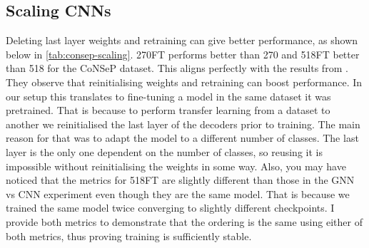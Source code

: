 \begin{table}[ht]
\vspace{0.2cm}

\caption{MoNuSAC dataset.}
    \label{tab:void-gnn}
\end{table}

\newpage
\subsection{Scaling CNNs}

Deleting last layer weights and retraining can give better performance, as shown below in \autoref{tab:consep-scaling}. 270FT performs better than 270 and 518FT better than 518 for the CoNSeP dataset. This aligns perfectly with the results from \cite{zhou2022fortuitous}. They observe that reinitialising weights and retraining can boost performance. In our setup this translates to fine-tuning a model in the same dataset it was pretrained. That is because to perform transfer learning from a dataset to another we reinitialised the last layer of the decoders prior to training. The main reason for that was to adapt the model to a different number of classes. The last layer is the only one dependent on the number of classes, so reusing it is impossible without reinitialising the weights in some way. Also, you may have noticed that the metrics for 518FT are slightly different than those in the GNN vs CNN experiment even though they are the same model. That is because we trained the same model twice converging to slightly different checkpoints. I provide both metrics to demonstrate that the ordering is the same using either of both metrics, thus proving training is sufficiently stable.

